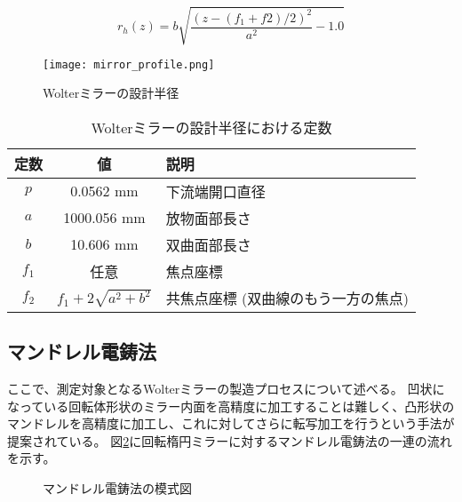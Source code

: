 \begin{equation}
    r_h(z) = b \sqrt{ \frac{(z - (f_1 + f2) / 2)^2}{a^2} - 1.0 }
\end{equation}

\begin{figure}[h]
\centering
\texttt{[image: mirror\_profile.png]}
\caption{Wolterミラーの設計半径}
\label{fig:wolter_profile}
\end{figure}

\begin{table}[htb]
    \begin{center}
      \caption{Wolterミラーの設計半径における定数}
      \begin{tabular}{|c|c|l|} \hline
        定数 & 値 & 説明 \\ \hline
        $p$ & 0.0562 mm & 下流端開口直径 \\
        $a$ & 1000.056 mm & 放物面部長さ \\
        $b$ & 10.606 mm & 双曲面部長さ \\ 
        $f_1$ & 任意 & 焦点座標 \\
        $f_2$ & $f_1 + 2 \sqrt{ a^2 + b^2 }$  & 共焦点座標 (双曲線のもう一方の焦点) \\\hline
      \end{tabular}
      \label{tb:wolter_profile_constants}
    \end{center}
\end{table}


\subsection{マンドレル電鋳法}
\label{chap1_mirror_mandrel}

ここで、測定対象となるWolterミラーの製造プロセスについて述べる。
凹状になっている回転体形状のミラー内面を高精度に加工することは難しく、凸形状のマンドレルを高精度に加工し、これに対してさらに転写加工を行うという手法が提案されている。\cite{Mimura2018}
図\ref{fig:mandrel_plating_pictures}に回転楕円ミラーに対するマンドレル電鋳法の一連の流れを示す。

\begin{figure}[!ht]
\centering
{}
\caption[]{マンドレル電鋳法の模式図}
\label{fig:mandrel_plating_pictures}
\end{figure}

